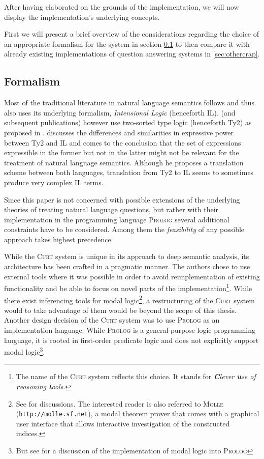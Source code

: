 \documentclass{scrartcl}
\newcommand{\abbr}{\textsf}
\newcommand{\pn}{\textsc}
\newcommand{\url}[1]{\texttt{http://#1}}
\newcommand{\prol}{\pn{Prolog} }
\begin{document}
After having elaborated on the grounds of the implementation, we will now
display the implementation's underlying concepts. %


First we will present a brief overview of the considerations regarding the
choice of an appropriate formalism for the system in section \ref{sec:formal}
to then compare it with already existing implementations of question answering
systems in \ref{sec:othercrap}.

\subsection{Formalism}\label{sec:formal}

Most of the traditional literature in natural language semantics follows
\cite{ptq} and thus also uses its underlying formalism, \emph{Intensional Logic}
(henceforth \abbr{IL}). \cite{gs:sqpa} (and subsequent publications) however use
two-sorted type logic (henceforth \abbr{Ty2}) as proposed in
\cite{gallin:ty2}. \cite{z:ilty2} discusses the differences and similarities in expressive power
between \abbr{Ty2} and \abbr{IL} and comes to the conclusion that the set of
expressions expressible in the former but not in the latter might not be
relevant for the treatment of natural language semantics. Although he proposes
a translation scheme between both languages, translation from \abbr{Ty2} to
\abbr{IL} seems to sometimes produce very complex \abbr{IL} terms.

Since this paper is not concerned with possible extensions of the underlying
theories of treating natural language questions, but rather with their
implementation in the programming language \pn{Prolog} several additional
constraints have to be considered. Among them the \emph{feasibility} of any
possible approach takes highest precedence.

While the \pn{Curt} system is unique in its approach to deep semantic analysis, its
architecture has been crafted in a pragmatic manner. The authors chose to use
external tools where it was possible in order to avoid reimplementation of
existing functionality and be able to focus on novel parts of the
implementation\footnote{The name of the \pn{Curt} system reflects this choice.
It stands for \emph{\textbf{C}lever \textbf{u}se of \textbf{r}easoning
\textbf{t}ools}.}. While there exist inferencing tools for modal
logic\footnote{See %
for discussions. The interested reader is also referred to \pn{Molle}
(\url{molle.sf.net}), a modal theorem prover that comes with a graphical user
interface that allows interactive investigation of the constructed indices.},
a restructuring of the \pn{Curt} system would to take advantage of them would be
beyond the scope of this thesis. Another design decision of the \pn{Curt} system
was to use \prol as an implementation language. While \prol is a general
purpose logic programming language, it is rooted in first-order predicate logic
and does not explicitly support modal logic\footnote{But see%
for a discussion of the implementation of modal logic into \prol}.
\end{document}
